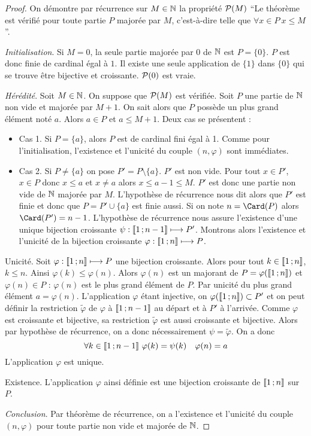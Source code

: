 \begin{proof}
  On démontre par récurrence sur $M \in \N$ la propriété $\P(M)$ ``Le théorème est vérifié pour toute partie $P$ majorée par $M$, c'est-à-dire telle que $\forall x \in P \ x \leq M$''.

\emph{Initialisation}. Si $M=0$, la seule partie majorée par $0$ de $\N$ est $P=\{0\}$. $P$ est donc finie de cardinal égal à $1$. Il existe une seule application de $\{1\}$ dans $\{0\}$ qui se trouve être bijective et croissante. $\P(0)$ est vraie.

\emph{Hérédité}. Soit $M \in \N$. On suppose que $\P(M)$ est vérifiée. Soit $P$ une partie de $\N$ non vide et majorée par $M+1$. On sait alors que $P$ possède un plus grand élément noté $a$. Alors $a \in P$ et $a \leq M+1$. Deux cas se présentent :
\begin{itemize}
\item Cas 1. Si $P=\{a\}$, alors $P$ est de cardinal fini égal à 1. Comme pour l'initialisation, l'existence et l'unicité du couple $(n, \varphi)$ sont immédiates.
\item Cas 2. Si $P \neq \{a\}$ on pose $P'=P\setminus\{a\}$. $P'$ est non vide. Pour tout $x \in P'$, $x \in P$ donc $x \leq a$ et $x \neq a$ alors $x \leq a-1 \leq M$. $P'$ est donc une partie non vide de $\N$ majorée par $M$. L'hypothèse de récurrence nous dit alors que $P'$ est finie et donc que $P=P' \cup \{a\}$ est finie aussi. Si on note $n = \Card(P)$ alors $\Card(P')=n-1$. L'hypothèse de récurrence nous assure l'existence d'une unique bijection croissante $\psi : \intervalleentier{1}{n-1}\longmapsto P'$. Montrons alors l'existence et l'unicité de la bijection croissante $\varphi : \intervalleentier{1}{n} \longmapsto P$.
\end{itemize}

Unicité. Soit $\varphi : \intervalleentier{1}{n} \longmapsto P$ une bijection croissante. Alors pour tout $k \in \intervalleentier{1}{n}$, $k \leq n$. Ainsi $\varphi(k) \leq \varphi(n)$. Alors $\varphi(n)$ est un majorant de $P=\varphi(\intervalleentier{1}{n})$ et $\varphi(n) \in P$ : $\varphi(n)$ est le plus grand élément de $P$. Par unicité du plus grand élément $a=\varphi(n)$. L'application $\varphi$ étant injective, on  $\varphi(\intervalleentier{1}{n}) \subset P'$ et on peut définir la restriction $\tilde{\varphi}$ de $\varphi$ à $\intervalleentier{1}{n-1}$ au départ et à $P'$ à l'arrivée. Comme $\varphi$ est croissante et bijective, sa restriction $\tilde{\varphi}$ est aussi croissante et bijective. Alors par hypothèse de récurrence, on a donc nécessairement $\psi = \tilde{\varphi}$. On a donc
\begin{equation}
  \forall k \in \intervalleentier{1}{n-1}\ \varphi(k)=\psi(k) \quad \varphi(n)=a
\end{equation}
L'application $\varphi$ est unique.

Existence. L'application $\varphi$ ainsi définie est une bijection croissante de $\intervalleentier{1}{n}$ sur $P$.

\emph{Conclusion}. Par théorème de récurrence, on a l'existence et l'unicité du couple $(n, \varphi)$ pour toute partie non vide et majorée de $\N$.
\end{proof}
